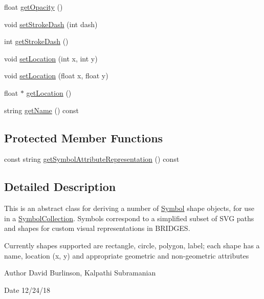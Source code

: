 \begin{DoxyCompactItemize}
\item 
float \mbox{\hyperlink{classbridges_1_1_symbol_abeda0c1f43346b91f028d2df80e270dc}{get\+Opacity}} ()
\item 
void \mbox{\hyperlink{classbridges_1_1_symbol_ab74d4afc6805db5be7613a82c7295c61}{set\+Stroke\+Dash}} (int dash)
\item 
int \mbox{\hyperlink{classbridges_1_1_symbol_aebd8935bc4f963a04412aa544beee27b}{get\+Stroke\+Dash}} ()
\item 
void \mbox{\hyperlink{classbridges_1_1_symbol_a9a1bdebb8dcec2871243a269e618a351}{set\+Location}} (int x, int y)
\item 
void \mbox{\hyperlink{classbridges_1_1_symbol_a5f774c3cbd407bc74d43e8d27bb6933f}{set\+Location}} (float x, float y)
\item 
float $\ast$ \mbox{\hyperlink{classbridges_1_1_symbol_a97f8b30d76dd0d8dd49167628bb3f810}{get\+Location}} ()
\item 
string \mbox{\hyperlink{classbridges_1_1_symbol_a798c3871fe791a841ab0e558807e5c6b}{get\+Name}} () const
\end{DoxyCompactItemize}
\subsection*{Protected Member Functions}
\begin{DoxyCompactItemize}
\item 
const string \mbox{\hyperlink{classbridges_1_1_symbol_a7818993a154ee736fe3d3ed65ce7d76e}{get\+Symbol\+Attribute\+Representation}} () const
\end{DoxyCompactItemize}


\subsection{Detailed Description}
This is an abstract class for deriving a number of \mbox{\hyperlink{classbridges_1_1_symbol}{Symbol}} shape objects, for use in a \mbox{\hyperlink{classbridges_1_1_symbol_collection}{Symbol\+Collection}}. Symbols correspond to a simplified subset of S\+VG paths and shapes for custom visual representations in B\+R\+I\+D\+G\+ES. 

Currently shapes supported are rectangle, circle, polygon, label; each shape has a name, location (x, y) and appropriate geometric and non-\/geometric attributes

\begin{DoxyAuthor}{Author}
David Burlinson, Kalpathi Subramanian 
\end{DoxyAuthor}
\begin{DoxyDate}{Date}
12/24/18 
\end{DoxyDate}


